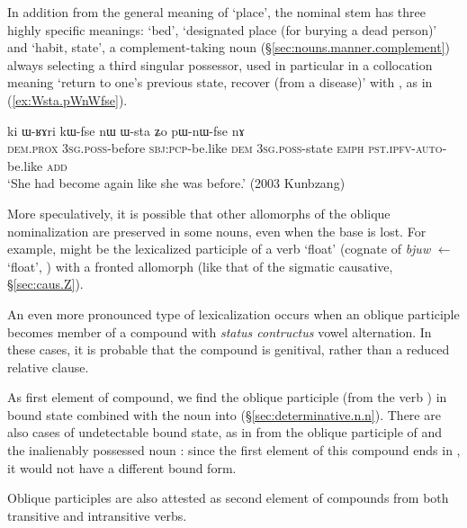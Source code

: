 In addition from the general meaning of `place', the nominal stem  has three highly specific meanings:  `bed',  `designated place (for burying a dead person)' and  `habit, state', a com\-ple\-ment-taking noun (§\ref{sec:nouns.manner.complement}) always selecting a third singular possessor, used in particular in a collocation meaning `return to one's previous state, recover (from a disease)' with , as in (\ref{ex:Wsta.pWnWfse}).

\begin{exe}
\ex \label{ex:Wsta.pWnWfse}
\gll  ki ɯ-ʁɤri kɯ-fse nɯ ɯ-sta ʑo pɯ-nɯ-fse nɤ \\
\textsc{dem}.\textsc{prox} \textsc{3sg}.\textsc{poss}-before \textsc{sbj}:\textsc{pcp}-be.like \textsc{dem} \textsc{3sg}.\textsc{poss}-state \textsc{emph} \textsc{pst}.\textsc{ipfv}-\textsc{auto}-be.like \textsc{add} \\
\glt  `She had become again like she was before.' (2003 Kunbzang)
 \end{exe}

More speculatively, it is possible that other allomorphs of the oblique nominalization are preserved in some nouns, even when the base is lost. For example,  might be the lexicalized participle of a verb  `float' (cognate of  \textit{bjuw} $\leftarrow$  `float', \citealt{zhangsy19cognates}) with a fronted  allomorph (like that of the sigmatic causative, §\ref{sec:caus.Z}).

An even more pronounced type of lexicalization occurs when an oblique participle becomes member of a compound with \textit{status contructus} vowel alternation. In these cases, it is probable that the compound is genitival, rather than a reduced relative clause.

As first element of compound, we find the oblique participle  (from the verb ) in bound state combined with the noun  into 
 (§\ref{sec:determinative.n.n}). There are also cases of undetectable bound state, as in  from the oblique participle of  and the inalienably possessed noun : since the first element of this compound  ends in , it would not have a different bound form.

Oblique participles are also attested as second element of compounds from both transitive and intransitive verbs. 

